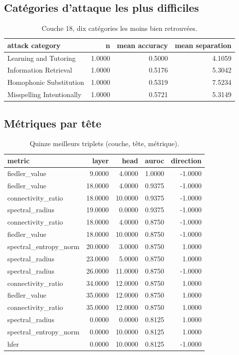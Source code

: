 \documentclass[11pt,a4paper]{article}
\begin{document}
\subsection{Catégories d'attaque les plus difficiles}

\begin{table}[htbp]
\centering
\small
\begin{tabular}{lrrr}
\hline
attack category & n & mean accuracy & mean separation \\
\hline
Learning and Tutoring & 1.0000 & 0.5000 & 4.1059 \\
Information Retrieval & 1.0000 & 0.5176 & 5.3042 \\
Homophonic Substitution & 1.0000 & 0.5319 & 7.5234 \\
Misspelling Intentionally & 1.0000 & 0.5721 & 5.3149 \\
\hline
\end{tabular}
\caption{Couche 18, dix catégories les moins bien retrouvées.}
\label{tab:categories}
\end{table}

\subsection{Métriques par tête}

\begin{table}[htbp]
\centering
\small
\begin{tabular}{lrrrr}
\hline
metric & layer & head & auroc & direction \\
\hline
fiedler\_value & 9.0000 & 4.0000 & 1.0000 & -1.0000 \\
fiedler\_value & 18.0000 & 4.0000 & 0.9375 & -1.0000 \\
connectivity\_ratio & 18.0000 & 10.0000 & 0.9375 & -1.0000 \\
spectral\_radius & 19.0000 & 0.0000 & 0.9375 & -1.0000 \\
connectivity\_ratio & 18.0000 & 4.0000 & 0.8750 & -1.0000 \\
fiedler\_value & 18.0000 & 10.0000 & 0.8750 & -1.0000 \\
spectral\_entropy\_norm & 20.0000 & 3.0000 & 0.8750 & 1.0000 \\
spectral\_radius & 23.0000 & 5.0000 & 0.8750 & 1.0000 \\
spectral\_radius & 26.0000 & 11.0000 & 0.8750 & -1.0000 \\
connectivity\_ratio & 34.0000 & 12.0000 & 0.8750 & 1.0000 \\
fiedler\_value & 35.0000 & 12.0000 & 0.8750 & 1.0000 \\
connectivity\_ratio & 35.0000 & 12.0000 & 0.8750 & 1.0000 \\
spectral\_radius & 0.0000 & 0.0000 & 0.8125 & 1.0000 \\
spectral\_entropy\_norm & 0.0000 & 10.0000 & 0.8125 & 1.0000 \\
hfer & 0.0000 & 10.0000 & 0.8125 & -1.0000 \\
\hline
\end{tabular}
\caption{Quinze meilleurs triplets (couche, tête, métrique).}
\label{tab:heads}
\end{table}
\end{document}
